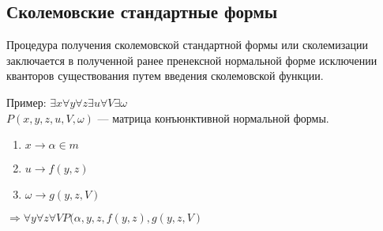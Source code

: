 \documentclass[a4paper,12pt]{report}
\begin{document}
\subsection{Сколемовские стандартные формы}

	Процедура получения сколемовской стандартной формы или сколемизации
	заключается в полученной ранее пренексной нормальной форме исключении
	кванторов существования путем введения сколемовской функции.\par
	Пример: $\exists x \forall y \forall z \exists u \forall V \exists \omega$\\
	$P(x,y,z,u,V,\omega)$ --- матрица конъюнктивной нормальной формы.\par

	\begin{enumerate}
		\item $x \to \alpha \in m$
		\item $u \to f(y,z)$
		\item $\omega \to g(y,z,V)$
	\end{enumerate}
	$\Rightarrow \forall y \forall z \forall V P(\alpha,y,z,f(y,z),g(y,z,V)$
\end{document}
